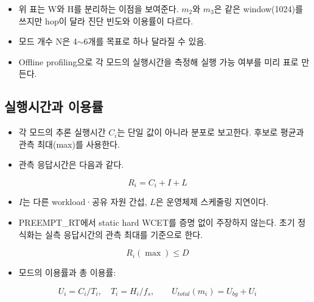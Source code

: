 \documentclass[10pt]{article}
\begin{document}
\begin{itemize}
\item 위 표는 W와 H를 분리하는 이점을 보여준다. $m_2$와 $m_3$은 같은 window(1024)를 쓰지만 hop이 달라 진단 빈도와 이용률이 다르다.
\item 모드 개수 N은 4$\sim$6개를 목표로 하나 달라질 수 있음.
\item Offline profiling으로 각 모드의 실행시간을 측정해 실행 가능 여부를 미리 표로 만든다.
\end{itemize}

\subsection{실행시간과 이용률}
\begin{itemize}
\item 각 모드의 추론 실행시간 $C_i$는 단일 값이 아니라 분포로 보고한다. 후보로 평균과 관측 최대(max)를 사용한다.
\item 관측 응답시간은 다음과 같다.
\end{itemize}
\[ R_i = C_i + I + L \]
\begin{itemize}
\item $I$는 다른 workload·공유 자원 간섭, $L$은 운영체제 스케줄링 지연이다.
\item PREEMPT\_RT에서 static hard WCET를 증명 없이 주장하지 않는다. 초기 정식화는 실측 응답시간의 관측 최대를 기준으로 한다.
\end{itemize}
\[ R_i(\max) \le D \]
\begin{itemize}
\item 모드의 이용률과 총 이용률:
\end{itemize}
\[ U_i = C_i / T_i,\quad T_i = H_i / f_s,\qquad U_{total}(m_i) = U_{bg} + U_i \]
\end{document}
